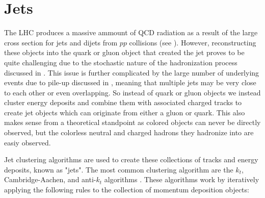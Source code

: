 \section{Jets} \label{sec:objects:jets}

The LHC produces a massive ammount of QCD radiation as a result of the large
cross section for jets and dijets from $pp$ collisions (see
).  However, reconstructing these objects into
the quark or gluon object that created the jet proves to be quite challenging
due to the stochastic nature of the hadronization process discussed in
.  This issue is further complicated by the large number
of underlying events due to pile-up discussed in , meaning
that multiple jets may be very close to each other or even overlapping.  So
instead of quark or gluon objects we instead cluster energy deposits and
combine them with associated charged tracks to create jet objects which can
originate from either a gluon or quark.  This also makes sense from a
theoretical standpoint as colored objects can never be directly observed, but
the colorless neutral and charged hadrons they hadronize into are easiy
observed.

Jet clustering algorithms are used to create these collections of tracks and
energy deposits, known as "jets".  The most common clustering algorithm are the
$k_{t}$, Cambridge-Aachen, and anti-$k_{t}$ algorithms \cite{Cacciari:2008gp}.
These algorithms work by iteratively applying the following rules to the
collection of momentum deposition objects:

